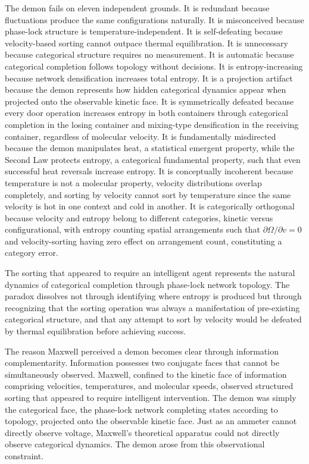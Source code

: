\documentclass[12pt,a4paper]{article}
\theoremstyle{definition}
\theoremstyle{remark}
\begin{document}
The demon fails on eleven independent grounds. It is redundant because fluctuations produce the same configurations naturally. It is misconceived because phase-lock structure is temperature-independent. It is self-defeating because velocity-based sorting cannot outpace thermal equilibration. It is unnecessary because categorical structure requires no measurement. It is automatic because categorical completion follows topology without decisions. It is entropy-increasing because network densification increases total entropy. It is a projection artifact because the demon represents how hidden categorical dynamics appear when projected onto the observable kinetic face. It is symmetrically defeated because every door operation increases entropy in both containers through categorical completion in the losing container and mixing-type densification in the receiving container, regardless of molecular velocity. It is fundamentally misdirected because the demon manipulates heat, a statistical emergent property, while the Second Law protects entropy, a categorical fundamental property, such that even successful heat reversals increase entropy. It is conceptually incoherent because temperature is not a molecular property, velocity distributions overlap completely, and sorting by velocity cannot sort by temperature since the same velocity is hot in one context and cold in another. It is categorically orthogonal because velocity and entropy belong to different categories, kinetic versus configurational, with entropy counting spatial arrangements such that $\partial \Omega / \partial v = 0$ and velocity-sorting having zero effect on arrangement count, constituting a category error.

The sorting that appeared to require an intelligent agent represents the natural dynamics of categorical completion through phase-lock network topology. The paradox dissolves not through identifying where entropy is produced but through recognizing that the sorting operation was always a manifestation of pre-existing categorical structure, and that any attempt to sort by velocity would be defeated by thermal equilibration before achieving success.

The reason Maxwell perceived a demon becomes clear through information complementarity. Information possesses two conjugate faces that cannot be simultaneously observed. Maxwell, confined to the kinetic face of information comprising velocities, temperatures, and molecular speeds, observed structured sorting that appeared to require intelligent intervention. The demon was simply the categorical face, the phase-lock network completing states according to topology, projected onto the observable kinetic face. Just as an ammeter cannot directly observe voltage, Maxwell's theoretical apparatus could not directly observe categorical dynamics. The demon arose from this observational constraint.
\end{document}
